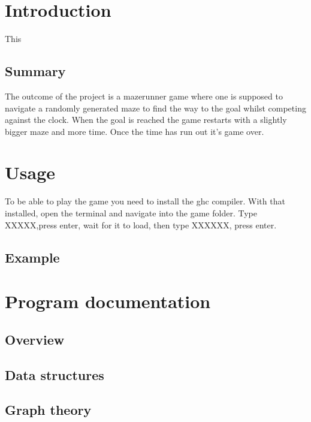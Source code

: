 \documentclass[12pt, a4paper]{article}
\begin{document}
\maketitle

\newpage


\tableofcontents


\newpage
\section{Introduction}
This 

\subsection{Summary}
The outcome of the project is a mazerunner game where one is supposed to navigate a randomly generated maze to find the way to the goal whilst competing against the clock. When the goal is reached the game restarts with a slightly bigger maze and more time. Once the time has run out it's game over.



\section{Usage}
To be able to play the game you need to install the ghc compiler. With that installed, open the terminal and navigate into the game folder. Type XXXXX,press enter, wait for it to load, then type XXXXXX, press enter. 

\subsection{Example}


\newpage
\section{Program documentation}
\subsection{Overview}
\subsection{Data structures}

\subsection{Graph theory}
\end{document}

